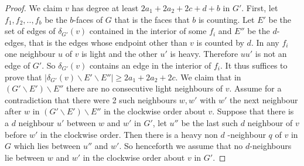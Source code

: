 \documentclass{article}
\newcommand{\0}{\mathbb{0}}
\newcommand{\1}{\mathbb{1}}
\begin{document}
\begin{proof}
We claim $v$ has degree at least  $2a_1 +2a_2+2c+d +b  $ in $G'$. First, let $f_1, f_2,.., f_b$ be the $b$-faces of $G$ that is the faces that $b$ is counting. Let $E'$ be the set of edges of $\delta_{G'} (v)$ contained in the interior of some $f_i$ and $E''$ be the $d$-edges, that is the edges whose endpoint other than $v$ is counted by $d$.  In any $f_i$ one neighbour $u$ of $v$ is light and the other $u'$ is heavy. Therefore $uu'$ is not an edge of $G'$. So $ \delta_{G'}(v) $ contains an edge in the interior of $f_i$. It thus suffices to prove that $ | \delta_{G'}(v) \backslash E' \backslash E'' | \geq  2a_1 +2a_2+2c$.  We claim that in $ (G' \backslash E' ) \backslash E'' $ there are no consecutive light neighbours of $v$. Assume for a contradiction that there were 2 such neighbours $w,w'$ with $w'$ the next neighbour after $w$ in $ (G' \backslash E' ) \backslash E'' $ in the clockwise order about $v$. Suppose that there is a $d$ neighbour $u'$ between $w$ and $w'$ in $G'$, let $u''$ be the last such $d$ neighbour of $ v $ before $w'$ in the clockwise order. Then there is a heavy non $d$ -neighbour $q$ of $v$ in $G$  which lies between $ u''$ and $w' $.  So henceforth we assume that no $d$-neighbours lie between $w$ and $ w'$ in the clockwise order about $v$ in $G'$.  


\end{proof}
\end{document}
